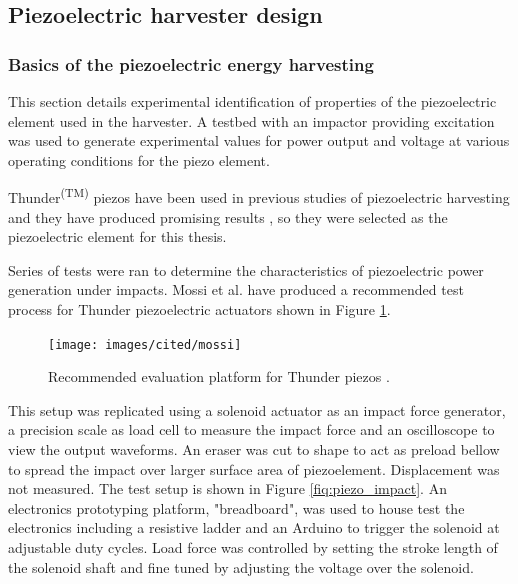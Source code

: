 \subsection{Piezoelectric harvester design}
\subsubsection{Basics of the piezoelectric energy harvesting }
This section details experimental identification of properties of the piezoelectric element used in the harvester. A testbed with an impactor providing excitation was used to generate experimental values for power output and voltage at various operating conditions for the piezo element.

Thunder\textsuperscript{(TM)} piezos have been used in previous studies of piezoelectric harvesting and they have produced promising results \cite{Manla2009}, so they were selected as the piezoelectric element for this thesis.

Series of tests were ran to determine the characteristics of piezoelectric power generation under impacts. Mossi et al. \cite{Mossi} have produced a recommended test process for Thunder piezoelectric actuators shown in Figure \ref{fiq:thunder_eval}.

\begin{figure}[htb]
  \begin{center}
  \texttt{[image: images/cited/mossi]}
  \end{center}
  \caption{Recommended evaluation platform for Thunder piezos \cite{Mossi}.}
  \label{fiq:thunder_eval}
\end{figure}

This setup was replicated using a solenoid actuator as an impact force generator, a precision scale as load cell to measure the impact force and an oscilloscope to view the output waveforms. An eraser was cut to shape to act as preload bellow to spread the impact over larger surface area of piezoelement. Displacement was not measured. The test setup is shown in Figure \ref{fiq:piezo_impact}. An electronics prototyping platform, "breadboard", was used to house test the electronics including a resistive ladder and an Arduino to trigger the solenoid at adjustable duty cycles. Load force was controlled by setting the stroke length of the solenoid shaft and fine tuned by adjusting the voltage over the solenoid. 

